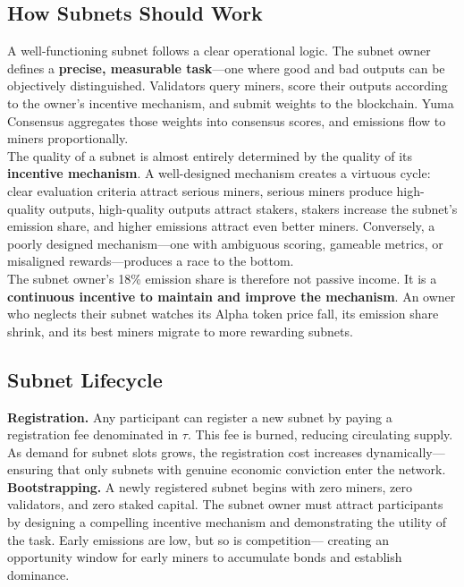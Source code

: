\documentclass[12pt, a4paper, oneside]{report}
\newcommand{\TAO}{$\tau$}            %
\theoremstyle{definition}
\begin{document}
\subsection{How Subnets Should Work}

A well-functioning subnet follows a clear operational logic. The subnet owner 
defines a \textbf{precise, measurable task}—one where good and bad outputs can 
be objectively distinguished. Validators query miners, score their outputs 
according to the owner's incentive mechanism, and submit weights to the 
blockchain. Yuma Consensus aggregates those weights into consensus scores, and 
emissions flow to miners proportionally.\\[0.4cm]

The quality of a subnet is almost entirely determined by the quality of its 
\textbf{incentive mechanism}. A well-designed mechanism creates a virtuous 
cycle: clear evaluation criteria attract serious miners, serious miners produce 
high-quality outputs, high-quality outputs attract stakers, stakers increase 
the subnet's emission share, and higher emissions attract even better miners. 
Conversely, a poorly designed mechanism—one with ambiguous scoring, gameable 
metrics, or misaligned rewards—produces a race to the bottom.\\[0.4cm]

The subnet owner's 18\% emission share is therefore not passive income. It is 
a \textbf{continuous incentive to maintain and improve the mechanism}. An owner 
who neglects their subnet watches its Alpha token price fall, its emission share 
shrink, and its best miners migrate to more rewarding subnets.

\subsection{Subnet Lifecycle}

\textbf{Registration.} Any participant can register a new subnet by paying a 
registration fee denominated in \TAO. This fee is burned, reducing circulating 
supply. As demand for subnet slots grows, the registration cost increases 
dynamically—ensuring that only subnets with genuine economic conviction enter 
the network.\\[0.4cm]

\textbf{Bootstrapping.} A newly registered subnet begins with zero miners, 
zero validators, and zero staked capital. The subnet owner must attract 
participants by designing a compelling incentive mechanism and demonstrating 
the utility of the task. Early emissions are low, but so is competition—
creating an opportunity window for early miners to accumulate bonds and 
establish dominance.\\[0.4cm]
\end{document}
